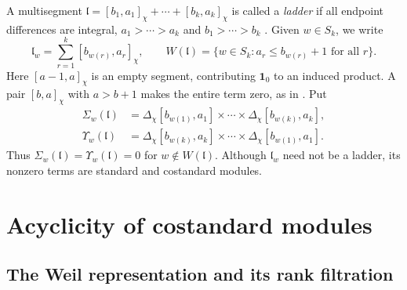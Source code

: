 \documentclass[10pt,a4paper]{article}
\theoremstyle{definition}
\theoremstyle{remark}
\numberwithin{equation}{section}
\newcommand{\fl}{\mathfrak{l}}
\newcommand{\one}{\mathbf{1}}
\newcommand{\De}{\Delta}
\begin{document}
A multisegment $\fl=[b_1,a_1]_\chi+\cdots+[b_k,a_k]_\chi$ is called a
\emph{ladder} if all endpoint differences are integral,
$a_1>\cdots>a_k$ and $b_1>\cdots>b_k$ \cite{LM2014}.
Given $w\in S_k$, we write
\[
 \fl_w=\sum_{r=1}^k[b_{w(r)},a_r]_\chi,\qquad
 W(\fl)=\{w\in S_k:a_r\leq b_{w(r)}+1\text{ for all }r\}.
\]
Here $[a-1,a]_\chi$ is an empty segment, contributing $\one_0$ to an
induced product. A pair $[b,a]_\chi$ with $a>b+1$ makes the entire term
zero, as in \cite[Theorem~1]{LM2014}. Put
\begin{align*}
 \Sigma_w(\fl)&=\De_\chi[b_{w(1)},a_1]\times\cdots\times
              \De_\chi[b_{w(k)},a_k],\\
 \Upsilon_w(\fl)&=\De_\chi[b_{w(k)},a_k]\times\cdots\times
              \De_\chi[b_{w(1)},a_1].
\end{align*}
Thus $\Sigma_w(\fl)=\Upsilon_w(\fl)=0$ for $w\notin W(\fl)$. Although $\fl_w$ need
not be a ladder, its nonzero terms are standard and costandard modules.
\section{Acyclicity of costandard modules}
\subsection{The Weil representation and its rank filtration}
\end{document}
